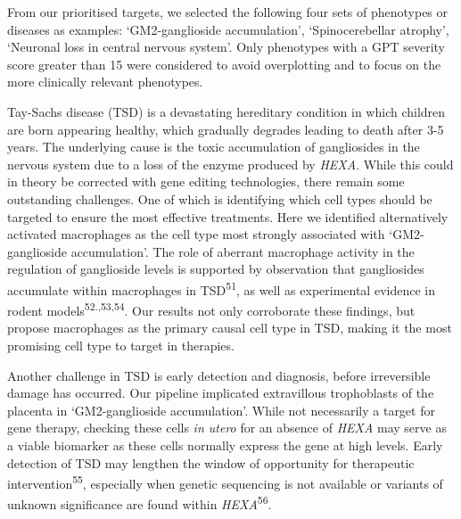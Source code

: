 \documentclass[
]{agujournal2019}
\begin{document}
\begin{figure}[H]
{}

\caption{\label{fig-therapy-examples}}

\end{figure}%

From our prioritised targets, we selected the following four sets of
phenotypes or diseases as examples: `GM2-ganglioside accumulation',
`Spinocerebellar atrophy', `Neuronal loss in central nervous system'.
Only phenotypes with a GPT severity score greater than 15 were
considered to avoid overplotting and to focus on the more clinically
relevant phenotypes.

Tay-Sachs disease (TSD) is a devastating hereditary condition in which
children are born appearing healthy, which gradually degrades leading to
death after 3-5 years. The underlying cause is the toxic accumulation of
gangliosides in the nervous system due to a loss of the enzyme produced
by \emph{HEXA}. While this could in theory be corrected with gene
editing technologies, there remain some outstanding challenges. One of
which is identifying which cell types should be targeted to ensure the
most effective treatments. Here we identified alternatively activated
macrophages as the cell type most strongly associated with
`GM2-ganglioside accumulation'. The role of aberrant macrophage activity
in the regulation of ganglioside levels is supported by observation that
gangliosides accumulate within macrophages in TSD\textsuperscript{51},
as well as experimental evidence in rodent
models\textsuperscript{52.,53,54}. Our results not only corroborate
these findings, but propose macrophages as the primary causal cell type
in TSD, making it the most promising cell type to target in therapies.

Another challenge in TSD is early detection and diagnosis, before
irreversible damage has occurred. Our pipeline implicated extravillous
trophoblasts of the placenta in `GM2-ganglioside accumulation'. While
not necessarily a target for gene therapy, checking these cells \emph{in
utero} for an absence of \emph{HEXA} may serve as a viable biomarker as
these cells normally express the gene at high levels. Early detection of
TSD may lengthen the window of opportunity for therapeutic
intervention\textsuperscript{55}, especially when genetic sequencing is
not available or variants of unknown significance are found within
\emph{HEXA}\textsuperscript{56}.
\end{document}

